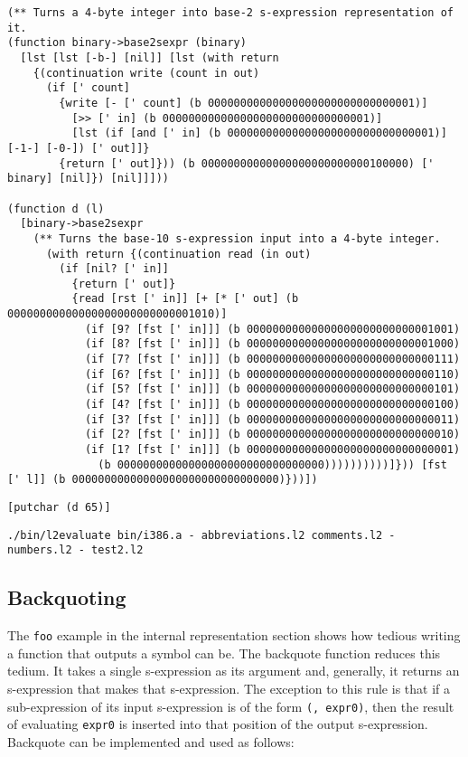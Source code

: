 \documentclass[twocolumn,landscape]{article}
\begin{document}
      \begin{lstlisting}[caption={numbers.l2}]
(** Turns a 4-byte integer into base-2 s-expression representation of it.
(function binary->base2sexpr (binary)
  [lst [lst [-b-] [nil]] [lst (with return
    {(continuation write (count in out)
      (if [' count]
        {write [- [' count] (b 00000000000000000000000000000001)]
          [>> [' in] (b 00000000000000000000000000000001)]
          [lst (if [and [' in] (b 00000000000000000000000000000001)] [-1-] [-0-]) [' out]]}
        {return [' out]})) (b 00000000000000000000000000100000) [' binary] [nil]}) [nil]]]))

(function d (l)
  [binary->base2sexpr
    (** Turns the base-10 s-expression input into a 4-byte integer.
      (with return {(continuation read (in out)
        (if [nil? [' in]]
          {return [' out]}
          {read [rst [' in]] [+ [* [' out] (b 00000000000000000000000000001010)]
            (if [9? [fst [' in]]] (b 00000000000000000000000000001001)
            (if [8? [fst [' in]]] (b 00000000000000000000000000001000)
            (if [7? [fst [' in]]] (b 00000000000000000000000000000111)
            (if [6? [fst [' in]]] (b 00000000000000000000000000000110)
            (if [5? [fst [' in]]] (b 00000000000000000000000000000101)
            (if [4? [fst [' in]]] (b 00000000000000000000000000000100)
            (if [3? [fst [' in]]] (b 00000000000000000000000000000011)
            (if [2? [fst [' in]]] (b 00000000000000000000000000000010)
            (if [1? [fst [' in]]] (b 00000000000000000000000000000001)
              (b 00000000000000000000000000000000))))))))))]})) [fst [' l]] (b 00000000000000000000000000000000)}))])
      \end{lstlisting}
      
      \begin{lstlisting}[caption={test2.l2}]
[putchar (d 65)]
      \end{lstlisting}
      
      \begin{lstlisting}[caption={shell}]
./bin/l2evaluate bin/i386.a - abbreviations.l2 comments.l2 - numbers.l2 - test2.l2
      \end{lstlisting}

    \subsection{Backquoting}\label{sec:backquoting}
      The \lstinline{foo} example in the internal representation section shows how tedious writing a function that outputs a symbol can be. The backquote function reduces this tedium. It takes a single s-expression as its argument and, generally, it returns an s-expression that makes that s-expression. The exception to this rule is that if a sub-expression of its input s-expression is of the form \lstinline{(, expr0)}, then the result of evaluating \lstinline{expr0} is inserted into that position of the output s-expression. Backquote can be implemented and used as follows:
\end{document}
